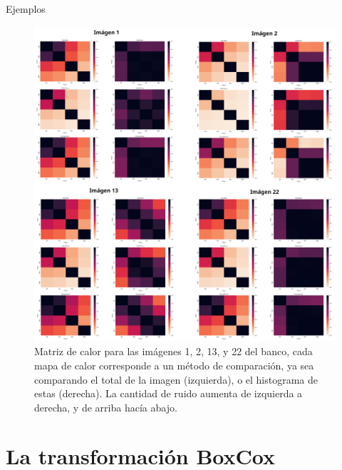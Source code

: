 \documentclass{beamer}
\begin{document}
\begin{frame}{Ejemplos}
    \begin{figure}[H]
        \centering
        \includegraphics[width=\textwidth]{heatmap_all.png}
        \caption{Matriz de calor para las im\'agenes 1, 2, 13, y 22 del banco, cada mapa de calor corresponde a un m\'etodo de comparaci\'on, ya sea comparando el total de la imagen (izquierda), o el histograma de estas (derecha). La cantidad de ruido aumenta de izquierda a derecha, y de arriba hacía abajo.}
        \label{fig:heatmapall}
    \end{figure}
\end{frame}


\section{La transformación BoxCox}
\end{document}

